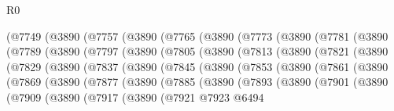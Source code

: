 \begin{lexlean}{R0}
\begin{coremodule}
    (@7749
      (@3890
        (@7757
          (@3890
            (@7765
              (@3890
                (@7773
                  (@3890
                    (@7781
                      (@3890
                        (@7789
                          (@3890
                            (@7797
                              (@3890
                                (@7805
                                  (@3890
                                    (@7813
                                      (@3890
                                        (@7821
                                          (@3890
                                            (@7829
                                              (@3890
                                                (@7837
                                                  (@3890
                                                    (@7845
                                                      (@3890
                                                        (@7853
                                                          (@3890
                                                            (@7861
                                                              (@3890
                                                                (@7869
                                                                  (@3890
                                                                    (@7877
                                                                      (@3890
                                                                        (@7885
                                                                          (@3890
                                                                            (@7893
                                                                              (@3890
                                                                                (@7901
                                                                                  (@3890
                                                                                    (@7909
                                                                                      (@3890
                                                                                        (@7917
                                                                                          (@3890
                                                                                            (@7921
                                                                                              @7923
                                                                                              @6494

\end{coremodule}
\end{lexlean}
